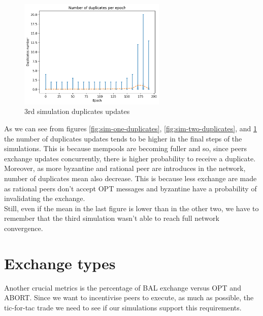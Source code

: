 \documentclass[mscthesis]{usiinfthesis}
\begin{document}
\begin{figure}[H]
  \centering
  \includegraphics[width=7cm]{images/3/3-duplicates.png}
  \caption{3rd simulation duplicates updates}
  \label{fig:sim-three-duplicates}
\end{figure}

As we can see from figures \ref{fig:sim-one-duplicates}, \ref{fig:sim-two-duplicates}, and \ref{fig:sim-three-duplicates} the number of duplicates updates tends to be higher in the final steps of the simulations. This is because mempools are becoming fuller and so, since peers exchange updates concurrently, there is higher probability to receive a duplicate. \\
Moreover, as more byzantine and rational peer are introduces in the network, number of duplicates mean also decrease. This is because less exchange are made as rational peers don't accept OPT messages and byzantine have a probability of invalidating the exchange. \\
Still, even if the mean in the last figure is lower than in the other two, we have to remember that the third simulation wasn't able to reach full network convergence.

\section{Exchange types}
Another crucial metrics is the percentage of BAL exchange versus OPT and ABORT. Since we want to incentivise peers to execute, as much as possible, the tic-for-tac trade we need to see if our simulations support this requirements.
\end{document}
